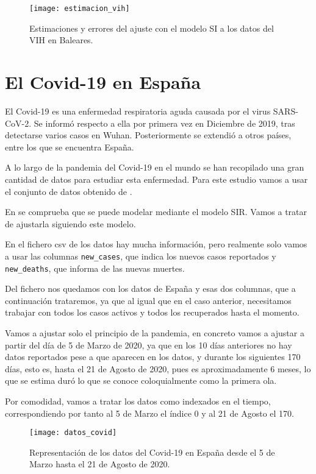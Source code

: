 \begin{figure}
\begin{center}
\caption{Estimaciones y errores del ajuste con el modelo SI a los datos del VIH en Baleares.}
\label{estimacion_vih}
\texttt{[image: estimacion\_vih]}
\end{center}
\end{figure}

\section{El Covid-19 en España}

El Covid-19 es una enfermedad respiratoria aguda causada por el virus SARS-CoV-2. Se informó respecto a ella por primera vez en Diciembre de 2019, tras detectarse varios casos en Wuhan. Posteriormente se extendió a otros países, entre los que se encuentra España.

A lo largo de la pandemia del Covid-19 en el mundo se han recopilado una gran cantidad de datos para estudiar esta enfermedad. Para este estudio vamos a usar el conjunto de datos obtenido de \cite{datos_covid}.

En \cite{enrique_amaro} se comprueba que se puede modelar mediante el modelo SIR. Vamos a tratar de ajustarla siguiendo este modelo.

En el fichero csv de los datos hay mucha información, pero realmente solo vamos a usar las columnas \verb|new_cases|, que indica los nuevos casos reportados y \verb|new_deaths|, que informa de las nuevas muertes.

Del fichero nos quedamos con los datos de España y esas dos columnas, que a continuación trataremos, ya que al igual que en el caso anterior, necesitamos trabajar con todos los casos activos y todos los recuperados hasta el momento.

Vamos a ajustar solo el principio de la pandemia, en concreto vamos a ajustar a partir del día de 5 de Marzo de 2020, ya que en los 10 días anteriores no hay datos reportados pese a que aparecen en los datos, y durante los siguientes 170 días, esto es, hasta el 21 de Agosto de 2020, pues es aproximadamente 6 meses, lo que se estima duró lo que se conoce coloquialmente como la primera ola.

Por comodidad, vamos a tratar los datos como indexados en el tiempo, correspondiendo por tanto al 5 de Marzo el índice 0 y al 21 de Agosto el 170.

\begin{figure}
\begin{center}
\caption{Representación de los datos del Covid-19 en España desde el 5 de Marzo hasta el 21 de Agosto de 2020.}
\label{datos_covid}
\texttt{[image: datos\_covid]}
\end{center}
\end{figure}


